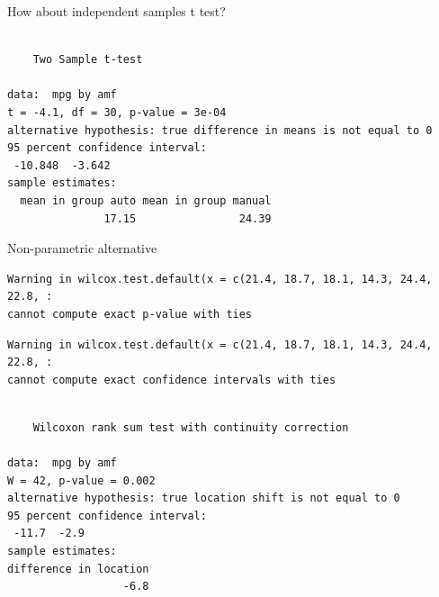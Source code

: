 \begin{frame}[fragile]{How about independent samples t test?}

\begin{Shaded}
\begin{Highlighting}[]
\StringTok{ }\OperatorTok{~}\NormalTok{))}
\end{Highlighting}
\end{Shaded}

\begin{verbatim}

    Two Sample t-test

data:  mpg by amf
t = -4.1, df = 30, p-value = 3e-04
alternative hypothesis: true difference in means is not equal to 0
95 percent confidence interval:
 -10.848  -3.642
sample estimates:
  mean in group auto mean in group manual 
               17.15                24.39 
\end{verbatim}

\end{frame}

\begin{frame}[fragile]{Non-parametric alternative}

\begin{Shaded}
\begin{Highlighting}[]
\StringTok{ }\OperatorTok{~}\StringTok{ } \NormalTok{))}
\end{Highlighting}
\end{Shaded}

\begin{verbatim}
Warning in wilcox.test.default(x = c(21.4, 18.7, 18.1, 14.3, 24.4, 22.8, :
cannot compute exact p-value with ties
\end{verbatim}

\begin{verbatim}
Warning in wilcox.test.default(x = c(21.4, 18.7, 18.1, 14.3, 24.4, 22.8, :
cannot compute exact confidence intervals with ties
\end{verbatim}

\begin{verbatim}

    Wilcoxon rank sum test with continuity correction

data:  mpg by amf
W = 42, p-value = 0.002
alternative hypothesis: true location shift is not equal to 0
95 percent confidence interval:
 -11.7  -2.9
sample estimates:
difference in location 
                  -6.8 
\end{verbatim}

\end{frame}

